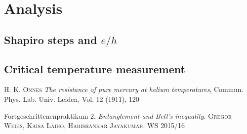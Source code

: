 \documentclass[a4paper,10pt]{article}
\begin{document}
\section{Analysis}
\subsection{Shapiro steps and $e/h$}
\subsection{Critical temperature measurement}
 \begin{thebibliography}{99}
 \textsc{H. K. Onnes} \textit{The resistance of pure mercury at helium temperatures}, Commun. Phys. Lab. Univ. Leiden, Vol. 12 (1911), 120 

 Fortgeschrittenenpraktikum 2, \textit{Entanglement and Bell’s inequality}. \textsc{Gregor Weihs, Kaisa Laiho, Harishankar Jayakumar}. WS 2015/16
\end{thebibliography}
\end{document}
